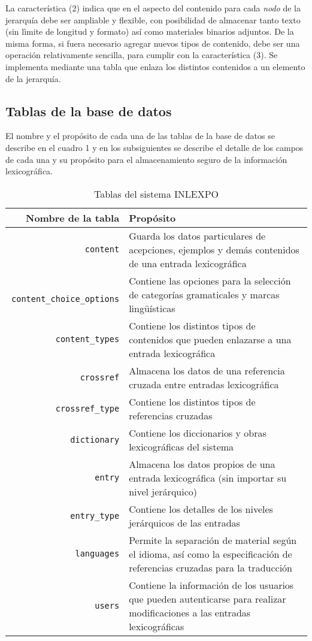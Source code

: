 \documentclass[11pt]{article} %
\begin{document}
La característica (2) indica que en el aspecto del contenido para cada \textit{nodo} de la jerarquía debe ser ampliable y flexible, con posibilidad de almacenar tanto texto (sin lìmite de longitud y formato) así como materiales binarios adjuntos. De la misma forma, si fuera necesario agregar nuevos tipos de contenido, debe ser una operación relativamente sencilla, para cumplir con la característica (3).  Se implementa mediante una tabla que enlaza los distintos contenidos a un elemento de la jerarquía.

\subsection*{Tablas de la base de datos}
El nombre y el propósito de cada una de las tablas de la base de datos se describe en el cuadro 1 y en los subsiguientes se describe el detalle de los campos de cada una y su propósito para el almacenamiento seguro de la información lexicográfica. 

\begin{table}
\centering
\begin{tabular}{rp{8cm}} 
\toprule 
Nombre de la tabla &Propósito \\ \midrule 
\texttt{content} & Guarda los datos particulares de acepciones, ejemplos y demás contenidos de una entrada lexicográfica\\
\texttt{ content\_choice\_options} & Contiene las opciones para la selección de categorías gramaticales y marcas lingüísticas\\
\texttt{ content\_types} & Contiene los distintos tipos de contenidos que pueden enlazarse a una entrada lexicográfica\\
\texttt{crossref} & Almacena los datos de una referencia cruzada entre entradas lexicográfica \\
\texttt{crossref\_type} & Contiene los distintos tipos de referencias cruzadas \\
\texttt{dictionary} & Contiene los diccionarios y obras lexicográficas del sistema \\ 
\texttt{ entry} & Almacena los datos propios de una entrada lexicográfica (sin importar su nivel jerárquico) \\
\texttt{ entry\_type} & Contiene los detalles de los niveles jerárquicos de las entradas\\
\texttt{ languages} & Permite la separación de material según el idioma, así como la especificación de referencias cruzadas para la traducción\\
\texttt{ users} & Contiene la información de los usuarios que pueden autenticarse para realizar modificaciones a las entradas lexicográficas \\
\bottomrule 
\end{tabular}
\caption{Tablas del sistema INLEXPO}
\end{table}
\end{document}
